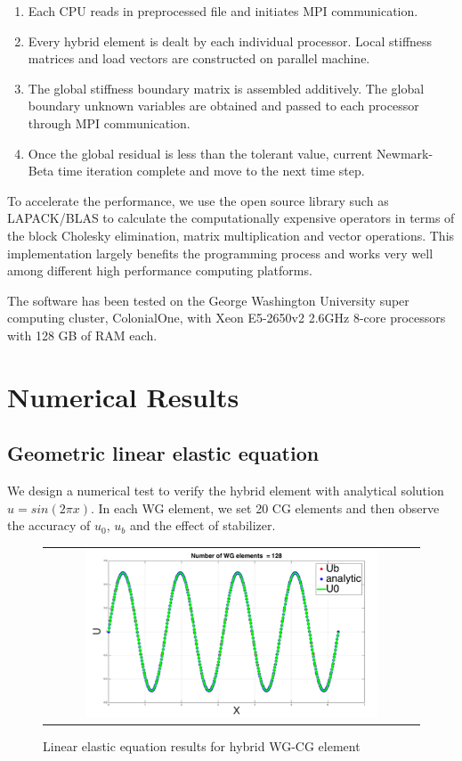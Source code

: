    \begin{enumerate}
   	\item Each CPU reads in preprocessed file and initiates MPI communication\cite{gropp1996high}.
   	\item Every hybrid element is dealt by each individual processor. Local stiffness matrices and load vectors are constructed on parallel machine.
   	\item The global stiffness boundary matrix is assembled additively. The global boundary unknown variables are obtained and passed to each processor through MPI communication.
   	\item Once the global residual is less than the tolerant value, current Newmark-Beta time iteration complete and move to the next time step.
   \end{enumerate}
   
   To accelerate the performance, we use the open source library such as LAPACK/BLAS to calculate the computationally expensive operators in terms of the block Cholesky elimination, matrix multiplication and vector operations. This implementation largely benefits the programming process and works very well among different high performance computing platforms.
   
   The software has been tested on the George Washington University super computing cluster, ColonialOne, with Xeon E5-2650v2 2.6GHz 8-core processors with 128 GB of RAM each.
   
   \section{Numerical Results}
   
   \subsection{Geometric linear elastic equation}
   
   We design a numerical test to verify the hybrid element with analytical solution $ u = sin (2 \pi x) $. In each WG element, we set 20 CG elements and then observe the accuracy of $ u_0 $, $ u_b $ and the effect of stabilizer.
   
      \begin{figure}[H]
      	\centering
      	\begin{tabular}{c}
      		\includegraphics[width=0.8\textwidth]{./pics/result1d1.png}
      	\end{tabular}
      	\caption{\footnotesize Linear elastic equation results for hybrid WG-CG element}
      \end{figure}
      
